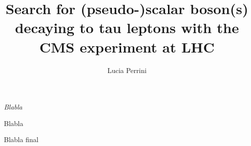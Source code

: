%
%
%

\author{Lucia Perrini}
\title{\textbf{Search for (pseudo-)scalar boson(s) decaying to tau leptons with the CMS experiment at LHC}}
\date{}

\maketitle


\hfill
\begin{minipage}{9cm}
{\it 
\vspace{2cm}
Blabla
\vspace{2mm}

Blabla
\vspace{2mm}

Blabla final}
\end{minipage}

\pagestyle{empty}
\tableofcontents
